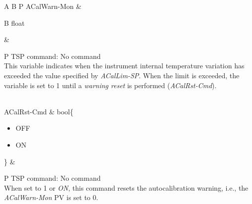 \documentclass[openany]{article}
\begin{document}
\begin{longtable}{A B P}
		ACalWarn-Mon & \begin{tabular}{B}
					float
				\end{tabular} & 
				\begin{tabular}{P}
					TSP command: No command \\
					This variable indicates when the instrument internal temperature variation has exceeded the value specified by \emph{ACalLim-SP}. When the limit is exceeded, the variable is set to 1 until a \emph{warning reset} is performed (\emph{ACalRst-Cmd}).
				\end{tabular} \\ \hline
		ACalRst-Cmd & bool\{\begin{itemize}[noitemsep]
					\small
					\item[] OFF
					\item[] ON
				\end{itemize}\} & 
				\begin{tabular}{P}
					TSP command: No command \\
					When set to 1 or \emph{ON}, this command resets the autocalibration warning, i.e., the \emph{ACalWarn-Mon} PV is set to 0.
				\end{tabular} \\ \hline
	\end{longtable}
\end{document}
